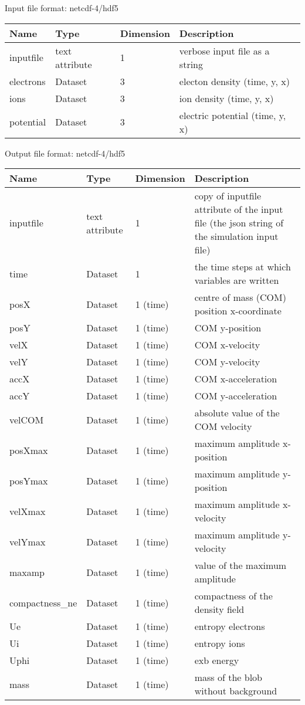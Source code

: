 Input file format: netcdf-4/hdf5
%
\begin{longtable}{lll>{\RaggedRight}p{7cm}}
\toprule
\rowcolor{gray!50}\textbf{Name} &  \textbf{Type} & \textbf{Dimension} & \textbf{Description}  \\ \midrule
inputfile  &             text attribute & 1 & verbose input file as a string \\
electrons                & Dataset & 3 & electon density (time, y, x) \\
ions                     & Dataset & 3 & ion density (time, y, x) \\
potential                & Dataset & 3 & electric potential (time, y, x) \\
\bottomrule
\end{longtable}

Output file format: netcdf-4/hdf5
%
\begin{longtable}{lll>{\RaggedRight}p{7cm}}
\toprule
\rowcolor{gray!50}\textbf{Name} &  \textbf{Type} & \textbf{Dimension} & \textbf{Description}  \\ \midrule
 inputfile & text attribute & 1 & copy of inputfile attribute of the input file (the json string of the simulation input file) \\
 time & Dataset & 1 & the time steps at which variables are written \\
 posX & Dataset & 1 (time) & centre of mass (COM) position x-coordinate \\
 posY & Dataset & 1 (time) &COM y-position \\
 velX & Dataset & 1 (time)& COM x-velocity \\
 velY & Dataset & 1 (time)& COM y-velocity \\
 accX & Dataset & 1 (time)& COM x-acceleration \\
 accY & Dataset & 1 (time)& COM y-acceleration \\
 velCOM & Dataset & 1 (time)&absolute value of the COM velocity \\
 posXmax& Dataset & 1 (time)&maximum amplitude x-position \\
 posYmax& Dataset & 1 (time)&maximum amplitude y-position \\
 velXmax& Dataset & 1 (time)&maximum amplitude x-velocity \\
 velYmax& Dataset & 1 (time)&maximum amplitude y-velocity \\
 maxamp & Dataset & 1 (time)&value of the maximum amplitude  \\
  compactness\_ne& Dataset & 1 (time) &compactness of the density field \\
 Ue& Dataset&  1 (time) &entropy electrons \\
 Ui &Dataset& 1 (time) & entropy ions \\
 Uphi& Dataset& 1 (time) &  exb energy \\
 mass& Dataset & 1 (time) & mass of the blob without background \\
\bottomrule
\end{longtable}






